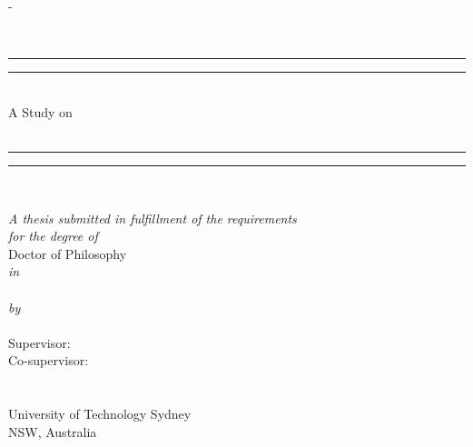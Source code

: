\begin{titlingpage}
\begin{SingleSpace}

\calccentering{\unitlength} 
\begin{adjustwidth*}{\unitlength}{-\unitlength}
\begin{center}

~\\
\vspace{17mm}

\rule[0.5ex]{\linewidth}{2pt}\vspace*{-\baselineskip}\vspace*{3.2pt}
\rule[0.5ex]{\linewidth}{1pt}\\%
\noindent
{\LARGE{A Study on} \\[.25cm] \HUGE{\utstitle}} \\[1.5mm] %
\rule[0.5ex]{\linewidth}{1pt}\vspace*{-\baselineskip}\vspace{4pt}
\rule[0.5ex]{\linewidth}{2pt}\\
\vspace {15mm}

\emph{\large A thesis submitted in fulfillment of the requirements}\\
\vspace {0.1in}
\emph{\large for the degree of}\\
\vspace {10mm}
{\large Doctor of Philosophy}\\
\vspace{2mm}
\emph{in}\\
\vspace{1mm}
{\large \utsfield}\\
\vspace {10mm}
\emph{\large by}\\
\vspace{4mm}
{\bfseries \Large \utsname} \\ %

\vspace {10mm}
{\large Supervisor: \utssupervisor}\\
{\large Co-supervisor: \utscosupervisor}\\

\vspace {10mm}
{\large \utsschool\\
\vspace {1mm}
\large \utsfaculty \\
\vspace {2mm}
{\Large University of Technology Sydney}\\
\vspace {1mm}
{NSW, Australia}
}\\
\vspace{23mm}




\end{center}
\end{adjustwidth*}
\end{SingleSpace}
\end{titlingpage}
